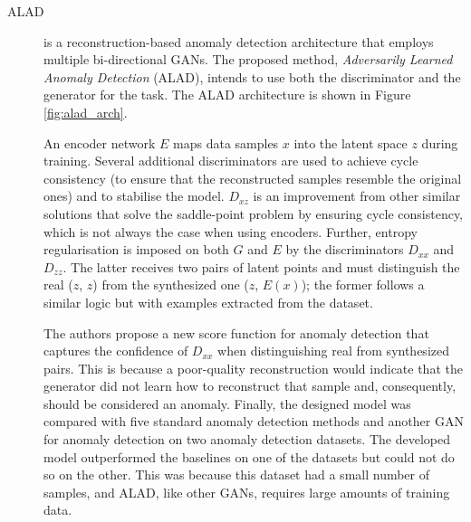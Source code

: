 \begin{description}
    \item[ALAD \cite{zenati.etal_AdversariallyLearnedAnomaly_2018}] is a reconstruction-based anomaly detection architecture that employs multiple bi-directional GANs. The proposed method, \textit{Adversarily Learned Anomaly Detection} (ALAD), intends to use both the discriminator and the generator for the task. The ALAD architecture is shown in Figure \ref{fig:alad_arch}.
    
    An encoder network $E$ maps data samples $x$ into the latent space $z$ during training. Several additional discriminators are used to achieve cycle consistency (to ensure that the reconstructed samples resemble the original ones) and to stabilise the model. $D_{xz}$ is an improvement from other similar solutions that solve the saddle-point problem by ensuring cycle consistency, which is not always the case when using encoders. Further, entropy regularisation is imposed on both $G$ and $E$ by the discriminators $D_{xx}$ and $D_{zz}$. The latter receives two pairs of latent points and must distinguish the real ($z$, $z$) from the synthesized one ($z$, $E(x)$); the former follows a similar logic but with examples extracted from the dataset. 
    
    The authors propose a new score function for anomaly detection that captures the confidence of $D_{xx}$ when distinguishing real from synthesized pairs. This is because a poor-quality reconstruction would indicate that the generator did not learn how to reconstruct that sample and, consequently, should be considered an anomaly. Finally, the designed model was compared with five standard anomaly detection methods and another GAN for anomaly detection on two anomaly detection datasets. The developed model outperformed the baselines on one of the datasets but could not do so on the other. This was because this dataset had a small number of samples, and ALAD, like other GANs, requires large amounts of training data.
\end{description}

